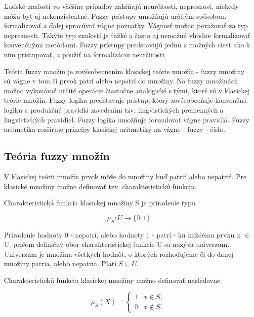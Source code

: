 Ľudské znalosti vo väčšine prípadov zahŕňajú neurčitosti, nepresnosť, niekedy môžu byť aj nekonzistentné. 
Fuzzy prístupy umožňujú určitým spôsobom formalizovať a ďalej spracúvať vágne poznatky. Vágnosť možno považovať za typ nepresnosti. 
 Takýto typ znalostí je ťažké a často aj nemožné vhodne formalizovať konvenčnými metódami. Fuzzy prístupy predstavujú jednu z možných ciest ako k nim pristupovať, a použiť na formalizáciu neurčitosti. \cite{gregorUI, gregorRef13}  

Teória fuzzy množín je zovšeobecnením klasickej teórie množín - fuzzy množiny sú vágne v tom či prvok patrí alebo nepatrí do množiny. 
Na fuzzy množinách možno vykonávať určité operácie čiastočne analogické s tými, ktoré sú v klasickej teórie množín. 
Fuzzy logika predstavuje prístup, ktorý zovšeobecňuje konvenčnú logiku a produkčné pravidlá zavedením tzv. lingvistických premenných a lingvistických pravidiel. 
Fuzzy logika umožňuje formulovať vágne pravidlá. 
Fuzzy aritmetika rozširuje princípy klasickej aritmetiky na vágne - fuzzy - čísla. \cite{gregorUI} 

\subsection{Teória fuzzy množín}

V klasickej teórii množín prvok môže do množiny buď patriť alebo nepatriť. Pre klasické množiny možno definovať tzv. charakteristickú funkciu. 

Charakteristická funkcia klasickej množiny S je priradenie typu \cite{gregorUI} 

\begin{equation}\label{charfunkcia}
\mu_S : U \longrightarrow \{0, 1\}
\end{equation}

Priradenie hodnoty 0 - nepatrí, alebo hodnoty 1 - patrí - ku každému prvku x $\in$ U, pričom definičný obor charakteristickej funkcie U sa nazýva univerzum. Univerzum je množina všetkých hodnôt, o ktorých rozhodujeme či do danej množiny patria, alebo nepatria. Platí $S \subseteq U$. \cite{gregorUI} 

Charakteristickú funkciu klasickej množiny možno definovať nasledovne \cite{gregorUI, gregorRef14} 

\begin{equation}\label{charfunkciafuzzy}
\mu_S (X) = 
\begin{cases}
1 &  x \in S, \\
0 &  x \notin S.
\end{cases}
\end{equation}

